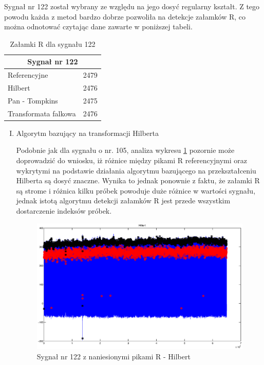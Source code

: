 \begin{itemize}
Sygnał nr 122 został wybrany ze względu na jego dosyć regularny kształt. Z tego powodu każda z metod bardzo dobrze pozwoliła na detekcje załamków R, co można odnotować czytając dane zawarte w poniższej tabeli.

\begin{table}[H]
\centering
\label{122peaks}
\caption{Załamki R dla sygnału 122}
\begin{tabular}{|l|c|}
\hline
\multicolumn{2}{|c|}{Sygnał nr 122}\\
\hline
Referencyjne & 2479 \\ \hline
Hilbert & 2476 \\ \hline
Pan - Tompkins & 2475 \\ \hline
Transformata falkowa & 2476 \\ \hline
\end{tabular}
\end{table}

\begin{enumerate}[I.]
\item Algorytm bazujący na transformacji Hilberta

Podobnie jak dla sygnału o nr. 105, analiza wykresu \ref{fig:122HC} pozornie może doprowadzić do wniosku, iż różnice między pikami R referencyjnymi oraz wykrytymi na podstawie działania algorytmu bazującego na przekształceniu Hilberta są dosyć znaczne. Wynika to jednak ponownie z faktu, że załamki R są strome i różnica kilku próbek powoduje duże różnice w wartości sygnału, jednak istotą algorytmu detekcji załamków R jest przede wszystkim dostarczenie indeksów próbek.

\newpage
\begin{figure}[H]
\centering
\includegraphics[scale=0.35]{R_PEAKS/wektorowe/122_hilbert_calosc.eps}
\caption{Sygnał nr 122 z naniesionymi pikami R - Hilbert}
\label{fig:122HC}
\end{figure}


\end{enumerate}
\end{itemize}
